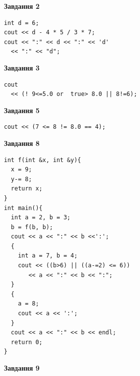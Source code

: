 \documentclass[12pt, ukrainian]{article}
\begin{document}
{\begin {large}
\begin{minipage}[t]{7.0cm}
\end{minipage}
\vline \hspace{1mm}
\begin{minipage}[t]{11.0cm}

\begin{center}
\textbf{Завдання 2}
\end{center}
\vspace{-8mm}

\begin{verbatim}
int d = 6;
cout << d - 4 * 5 / 3 * 7;
cout << ":" << d << ":" << 'd' 
  << ":" << "d";
\end{verbatim}



\begin{center}
\textbf{Завдання 3}
\end{center}
\vspace{-8mm}

\begin{verbatim}
cout 
  << (! 9<=5.0 or  true> 8.0 || 8!=6);
\end{verbatim}



\begin{center}
\textbf{Завдання 5}
\end{center}
\vspace{-8mm}

\begin{verbatim}
cout << (7 <= 8 != 8.0 == 4);
\end{verbatim}



\begin{center}
\textbf{Завдання 8}
\end{center}
\vspace{-8mm}

\begin{verbatim}
int f(int &x, int &y){
  x = 9;
  y-= 8;
  return x;
}
int main(){
  int a = 2, b = 3;
  b = f(b, b);
  cout << a << ":" << b <<':';
  {
    int a = 7, b = 4;
    cout << ((b>6) || ((a-=2) <= 6))
       << a << ":" << b << ":";
  }
  {
    a = 8;
    cout << a << ':';
  }
  cout << a << ":" << b << endl;
  return 0;
}
\end{verbatim}

\end{minipage}


\begin{minipage}[t]{7.0cm}

\begin{center}
\textbf{Завдання 9}
\end{center}
\vspace{-8mm}


\end{minipage}
\end{large}}
\end{document}
